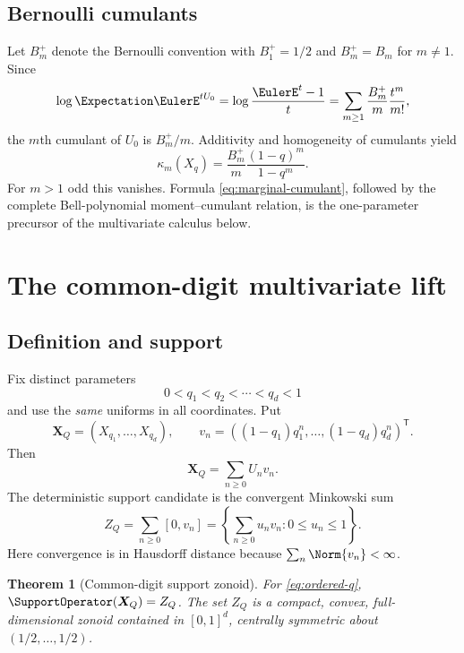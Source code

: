 \documentclass[11pt,a4paper]{article}
\newtheorem{theorem}{Theorem}[section]
\theoremstyle{definition}
\theoremstyle{remark}
\newcommand{\vct}[1]{\boldsymbol{#1}}
\begin{document}
\subsection{Bernoulli cumulants}

Let $B_m^+$ denote the Bernoulli convention with $B_1^+=1/2$ and $B_m^+=B_m$ for $m\ne1$.  Since
\[
 \log\Expectation\EulerE^{tU_0}=\log\frac{\EulerE^t-1}{t}
  =\sum_{m\ge1}\frac{B_m^+}{m}\frac{t^m}{m!},
\]
the $m$th cumulant of $U_0$ is $B_m^+/m$.  Additivity and homogeneity of cumulants yield
\begin{equation}
  \kappa_m(X_q)
   =\frac{B_m^+}{m}\frac{(1-q)^m}{1-q^m}.
  \label{eq:marginal-cumulant}
\end{equation}
For $m>1$ odd this vanishes.  Formula \eqref{eq:marginal-cumulant}, followed by the complete Bell-polynomial moment--cumulant relation, is the one-parameter precursor of the multivariate calculus below.

\section{The common-digit multivariate lift}
\label{sec:commonlift}

\subsection{Definition and support}

Fix distinct parameters
\begin{equation}
  0<q_1<q_2<\cdots<q_d<1
  \label{eq:ordered-q}
\end{equation}
and use the \emph{same} uniforms in all coordinates.  Put
\begin{equation}
  \vct X_Q=(X_{q_1},\ldots,X_{q_d}),\qquad
  v_n=((1-q_1)q_1^n,\ldots,(1-q_d)q_d^n)^\mathsf{T}.
  \label{eq:vector-law}
\end{equation}
Then
\begin{equation}
  \vct X_Q=\sum_{n\ge0}U_nv_n.
  \label{eq:vector-series}
\end{equation}
The deterministic support candidate is the convergent Minkowski sum
\begin{equation}
  Z_Q=\sum_{n\ge0}[0,v_n]
   =\left\{\sum_{n\ge0}u_nv_n:0\le u_n\le1\right\}.
  \label{eq:zonoid}
\end{equation}
Here convergence is in Hausdorff distance because $\sum_n\Norm{v_n}<\infty$.

\begin{theorem}[Common-digit support zonoid]
\label{thm:support-zonoid}
For \eqref{eq:ordered-q}, $\SupportOperator(\vct X_Q)=Z_Q$.  The set $Z_Q$ is a compact, convex, full-dimensional zonoid contained in $[0,1]^d$, centrally symmetric about $(1/2,\ldots,1/2)$.
\end{theorem}
\end{document}
